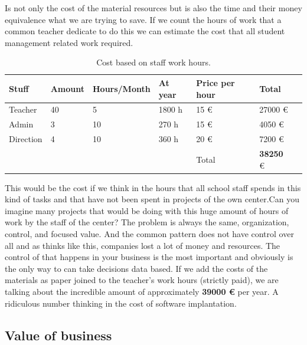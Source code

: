Is not only the cost of the material resources but is also the time and their money
equivalence what we are trying to save.  If we count the hours of work that a
common teacher dedicate to do this we can estimate the cost that all student
management related work required.

\begin{table}[H]
\centering

\begin{tabular}{@{}lllllll@{}}

Stuff & Amount & Hours/Month & At year & Price per hour & Total  \\
\midrule

Teacher     & 40 & 5    & 1800 h   & 15 \euro  & 27000  \euro  \\
Admin       & 3  & 10   & 270 h   & 15 \euro  & 4050   \euro  \\
Direction   & 4  & 10   & 360 h   & 20 \euro  & 7200   \euro  \\

\midrule
& & & & Total & \textbf{38250} \euro \\
\end{tabular}
\caption{Cost based on staff work hours.}
\label{my-label}
\end{table}

\noindent This would be the cost if we think in the hours that all school staff spends
in this kind of tasks and that have not been spent in projects of the own
center.Can you imagine many projects that would be doing with this huge
amount of hours of work by the staff of the center?
\intro
The problem is always the same, organization, control, and focused value. And
the common pattern does not have control over all and as thinks like this,
companies lost a lot of money and resources. The control of that happens in your
business is the most important and obviously is the only way to can take
decisions data based.
\intro
If we add the costs of the materials as paper joined to the teacher's work hours
(strictly paid), we are talking about the incredible amount of approximately
\textbf{39000 \euro} per year. A ridiculous number thinking in the cost of
software implantation.

\subsection{Value of business}

